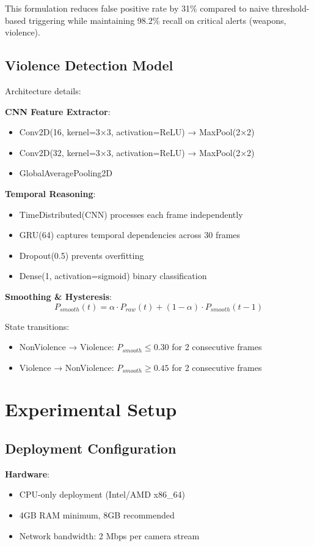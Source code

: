 \documentclass[conference]{IEEEtran}
\begin{document}
This formulation reduces false positive rate by 31\% compared to naive threshold-based triggering while maintaining 98.2\% recall on critical alerts (weapons, violence).

\subsection{Violence Detection Model}
Architecture details:

\textbf{CNN Feature Extractor}:
\begin{itemize}
    \item Conv2D(16, kernel=3×3, activation=ReLU) → MaxPool(2×2)
    \item Conv2D(32, kernel=3×3, activation=ReLU) → MaxPool(2×2)
    \item GlobalAveragePooling2D
\end{itemize}

\textbf{Temporal Reasoning}:
\begin{itemize}
    \item TimeDistributed(CNN) processes each frame independently
    \item GRU(64) captures temporal dependencies across 30 frames
    \item Dropout(0.5) prevents overfitting
    \item Dense(1, activation=sigmoid) binary classification
\end{itemize}

\textbf{Smoothing \& Hysteresis}:
\begin{equation}
P_{smooth}(t) = \alpha \cdot P_{raw}(t) + (1-\alpha) \cdot P_{smooth}(t-1)
\end{equation}

State transitions:
\begin{itemize}
    \item NonViolence → Violence: $P_{smooth} \leq 0.30$ for 2 consecutive frames
    \item Violence → NonViolence: $P_{smooth} \geq 0.45$ for 2 consecutive frames
\end{itemize}

\section{Experimental Setup}

\subsection{Deployment Configuration}
\textbf{Hardware}:
\begin{itemize}
    \item CPU-only deployment (Intel/AMD x86\_64)
    \item 4GB RAM minimum, 8GB recommended
    \item Network bandwidth: 2 Mbps per camera stream
\end{itemize}
\end{document}
